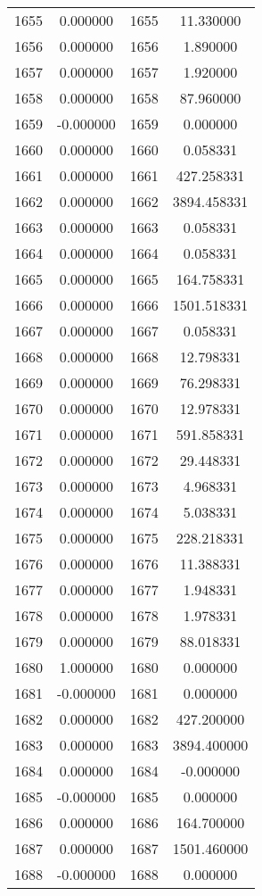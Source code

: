 \documentclass[12pt]{article}
\begin{document}
\begin{longtable}{@{}cccc@{}}
1655 & 0.000000 & 1655 & 11.330000 \\
1656 & 0.000000 & 1656 & 1.890000 \\
1657 & 0.000000 & 1657 & 1.920000 \\
1658 & 0.000000 & 1658 & 87.960000 \\
1659 & -0.000000 & 1659 & 0.000000 \\
1660 & 0.000000 & 1660 & 0.058331 \\
1661 & 0.000000 & 1661 & 427.258331 \\
1662 & 0.000000 & 1662 & 3894.458331 \\
1663 & 0.000000 & 1663 & 0.058331 \\
1664 & 0.000000 & 1664 & 0.058331 \\
1665 & 0.000000 & 1665 & 164.758331 \\
1666 & 0.000000 & 1666 & 1501.518331 \\
1667 & 0.000000 & 1667 & 0.058331 \\
1668 & 0.000000 & 1668 & 12.798331 \\
1669 & 0.000000 & 1669 & 76.298331 \\
1670 & 0.000000 & 1670 & 12.978331 \\
1671 & 0.000000 & 1671 & 591.858331 \\
1672 & 0.000000 & 1672 & 29.448331 \\
1673 & 0.000000 & 1673 & 4.968331 \\
1674 & 0.000000 & 1674 & 5.038331 \\
1675 & 0.000000 & 1675 & 228.218331 \\
1676 & 0.000000 & 1676 & 11.388331 \\
1677 & 0.000000 & 1677 & 1.948331 \\
1678 & 0.000000 & 1678 & 1.978331 \\
1679 & 0.000000 & 1679 & 88.018331 \\
1680 & 1.000000 & 1680 & 0.000000 \\
1681 & -0.000000 & 1681 & 0.000000 \\
1682 & 0.000000 & 1682 & 427.200000 \\
1683 & 0.000000 & 1683 & 3894.400000 \\
1684 & 0.000000 & 1684 & -0.000000 \\
1685 & -0.000000 & 1685 & 0.000000 \\
1686 & 0.000000 & 1686 & 164.700000 \\
1687 & 0.000000 & 1687 & 1501.460000 \\
1688 & -0.000000 & 1688 & 0.000000 \\

\end{longtable}
\end{document}
